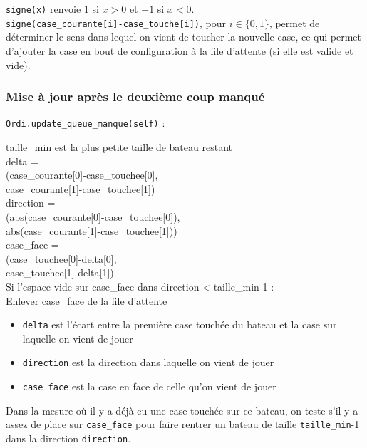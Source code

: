 \texttt{signe(x)} renvoie 1 si $x>0$ et $-1$ si $x<0$.\\
\texttt{signe(case\_courante[i]-case\_touche[i])}, pour $i\in\{0,1\}$, permet de déterminer le sens dans lequel on vient de toucher la nouvelle case, ce qui permet d'ajouter la case en bout de configuration à la file d'attente (si elle est valide et vide).

\newpage
\subsubsection{Mise à jour après le deuxième coup manqué}\label{update_queue_manque}
\texttt{Ordi.update\_queue\_manque(self)} :

\begin{algo1}
taille\_min est la plus petite taille de bateau restant\\
delta = \\
(case\_courante[0]-case\_touchee[0],\\
 case\_courante[1]-case\_touchee[1])\\
direction = \\
(abs(case\_courante[0]-case\_touchee[0]),\\
 abs(case\_courante[1]-case\_touchee[1]))\\
case\_face = \\
(case\_touchee[0]-delta[0],\\
 case\_touchee[1]-delta[1])\\
Si l'espace vide sur case\_face dans direction < taille\_min-1 :\\
Enlever case\_face de la file d'attente\\
\end{algo1}

\begin{itemize}
\item \texttt{delta} est l'écart entre la première case touchée du bateau et la case sur laquelle on vient de jouer
\item \texttt{direction} est la direction dans laquelle on vient de jouer
\item \texttt{case\_face} est la case en face de celle qu'on vient de jouer
\end{itemize}

\medskip

Dans la mesure où il y a déjà eu une case touchée sur ce bateau, on teste s'il y a assez de place sur \texttt{case\_face} pour faire rentrer un bateau de taille \texttt{taille\_min}-1 dans la direction \texttt{direction}.

